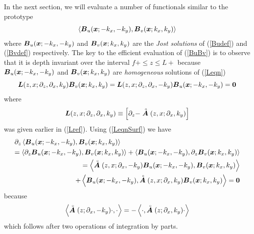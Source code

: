 In the next section, we will evaluate a number of functionals similar to 
the prototype
\begin{equation}\label{BuBv}
\langle {\mbox{\boldmath$\mit B$\unboldmath}}_{u}({\mbox{\boldmath$\mit x$\unboldmath}};-k_{x},-k_{y}) , 
{\mbox{\boldmath$\mit B$\unboldmath}}_{v}({\mbox{\boldmath$\mit x$\unboldmath}};k_{x},k_{y})\rangle
\end{equation}
 where ${\mbox{\boldmath$\mit B$\unboldmath}}_{u}({\mbox{\boldmath$\mit x$\unboldmath}};-k_{x},-k_{y}) $ and 
$ {\mbox{\boldmath$\mit B$\unboldmath}}_{v}({\mbox{\boldmath$\mit x$\unboldmath}};k_{x},k_{y})$ are the {\em Jost solutions\/} of 
(\ref{Budef}) and  (\ref{Bvdef})  respectively.
The key to the efficient evaluation of (\ref{BuBv})
is to observe that it is depth invariant over the interval $f+\le z \le 
L+$ because ${\mbox{\boldmath$\mit B$\unboldmath}}_{u}({\mbox{\boldmath$\mit x$\unboldmath}};-k_{x},-k_{y})$ and 
${\mbox{\boldmath$\mit B$\unboldmath}}_{v}({\mbox{\boldmath$\mit x$\unboldmath}};k_{x},k_{y})$ are {\em 
homogeneous\/} solutions of (\ref{Leqn})
\begin{equation} \label{LeqnSurf}
{\mbox{\boldmath$\mit L$\unboldmath}}(z,x;{\partial }_{z},{\partial }_{x},{k}_{y})
{\mbox{\boldmath$\mit B$\unboldmath}}_{v}({\mbox{\boldmath$\mit x$\unboldmath}};k_{x},k_{y}) = 
{\mbox{\boldmath$\mit L$\unboldmath}}(z,x;{\partial }_{z},{\partial }_{x},-{k}_{y})
{\mbox{\boldmath$\mit B$\unboldmath}}_{u}({\mbox{\boldmath$\mit x$\unboldmath}};-k_{x},-k_{y}) ={\bf 0}
\end{equation}
where 
\[
{\mbox{\boldmath$\mit L$\unboldmath}}(z,x;{\partial }_{z},{\partial }_{x},{k}_{y})\equiv
\left[\partial_{z}-\stackrel{\scriptscriptstyle _{\,\,\circ}}{ \mbox{\boldmath$\mit A$\unboldmath}}(z,x;{\partial }_{x},{k}_{y})\right]
\]
was given earlier in (\ref{Lref}).
Using (\ref{LeqnSurf}) we have
\begin{eqnarray} \label{invariant}
\lefteqn{
{\partial }_{z}\left\langle{\bmi B}_{u}({\bmi x};-k_{x},-k_{y}),
{\bmi B}_{v}({\bmi x};k_{x},k_{y})\right\rangle}\nonumber\\
&&\!\!\!\!\!\!
=
\left\langle{{ \partial 
}_{z}{\bmi B}_{u}({\bmi x};-k_{x},-k_{y}),
{\bmi B}_{v}({\bmi x};k_{x},k_{y})}\right\rangle+
\left\langle{{\bmi B}_{u}({\bmi x};-k_{x},-k_{y}),{ \partial 
}_{z}{\bmi B}_{v}({\bmi x};k_{x},k_{y})}\right\rangle \nonumber\\
&&\!\!\!\!\!\!
=
\left\langle{\rf{\bmi A}(z,x;{\partial }_{x},-{k}_{y})
{\bmi B}_{u}({\bmi x};-k_{x},-k_{y}),
{\bmi B}_{v}({\bmi x};k_{x},k_{y})}\right\rangle\nonumber\\
&&\qquad\qquad
+
\left\langle{{\bmi B}_{u}({\bmi x};-k_{x},-k_{y}),
\rf{\bmi A}(z,x;{\partial }_{x},{k}_{y}){\bmi B}_{v}
({\bmi x};k_{x},k_{y})}\right\rangle={\bf 
0}
\end{eqnarray}
because 
\begin{equation} \label{rfAsym}
\left\langle{\stackrel{\scriptscriptstyle _{\,\,\circ}}{ \mbox{\boldmath$\mit A$\unboldmath}}(z;{\partial }_{x},-{k}_{y})\cdot,\cdot}\right\rangle=-
\left\langle{\cdot,\stackrel{\scriptscriptstyle _{\,\,\circ}}{ \mbox{\boldmath$\mit A$\unboldmath}}(z;{\partial }_{x},{k}_{y})\cdot}\right\rangle
\end{equation}
which follows after two operations of integration by parts.



